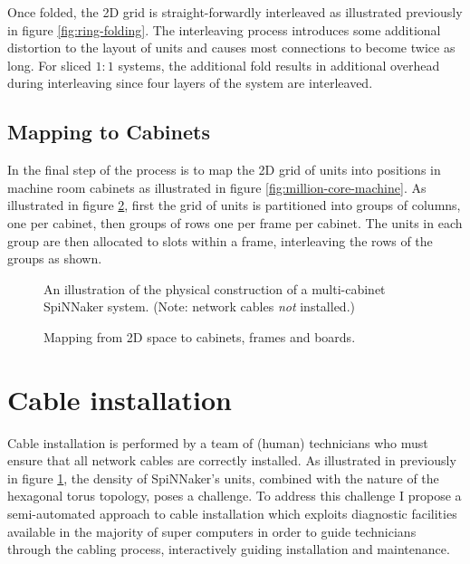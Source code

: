 			Once folded, the 2D grid is straight-forwardly interleaved as illustrated
			previously in figure \ref{fig:ring-folding}. The interleaving process
			introduces some additional distortion to the layout of units and causes
			most connections to become twice as long. For sliced $1:1$ systems, the
			additional fold results in additional overhead during interleaving since
			four layers of the system are interleaved.
		
		\subsection{Mapping to Cabinets}
			
			In the final step of the process is to map the 2D grid of units into
			positions in machine room cabinets as illustrated in figure
			\ref{fig:million-core-machine}. As illustrated in figure
			\ref{fig:cabinetisation}, first the grid of units is partitioned into
			groups of columns, one per cabinet, then groups of rows one per frame per
			cabinet. The units in each group are then allocated to slots within a
			frame, interleaving the rows of the groups as shown.
			
			\begin{figure}
				\center
				
				\caption{An illustration of the physical construction of a
				multi-cabinet SpiNNaker system. (Note: network cables \emph{not}
				installed.)}
				\label{fig:cabinet-units}
			\end{figure}
			
			\begin{figure}
				\center
				
				\caption{Mapping from 2D space to cabinets, frames and boards.}
				\label{fig:cabinetisation}
			\end{figure}
		
	\section{Cable installation}
		
		Cable installation is performed by a team of (human) technicians who must
		ensure that all network cables are correctly installed. As illustrated in
		previously in figure \ref{fig:cabinet-units}, the density of SpiNNaker's
		units, combined with the nature of the hexagonal torus topology, poses a
		challenge. To address this challenge I propose a semi-automated approach to
		cable installation which exploits diagnostic facilities available in the
		majority of super computers in order to guide technicians through the
		cabling process, interactively guiding installation and maintenance.
		
